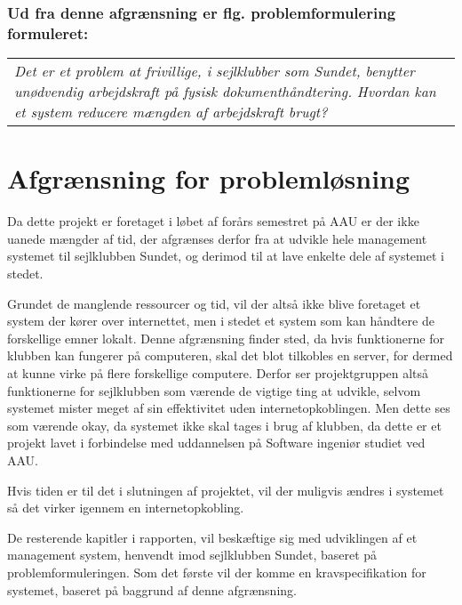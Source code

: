 \subsubsection*{Ud fra denne afgrænsning er flg. problemformulering formuleret:}
\begin{center}
\begin{tabular}{|p{14cm}|}
\textit{Det er et problem at frivillige, i sejlklubber som Sundet, benytter unødvendig arbejdskraft på fysisk dokumenthåndtering. Hvordan kan et system reducere mængden af arbejdskraft brugt? }
\end{tabular}
\end{center}


\section{Afgrænsning for problemløsning}

Da dette projekt er foretaget i løbet af forårs semestret på AAU er der ikke uanede mængder af tid, der afgrænses derfor fra at udvikle hele management systemet til sejlklubben Sundet, og derimod til at lave enkelte dele af systemet i stedet. 

Grundet de manglende ressourcer og tid, vil der altså ikke blive foretaget et system der kører over internettet, men i stedet et system som kan håndtere de forskellige emner lokalt. Denne afgrænsning finder sted, da hvis funktionerne for klubben kan fungerer på computeren, skal det blot tilkobles en server, for dermed at kunne virke på flere forskellige computere. Derfor ser projektgruppen altså funktionerne for sejlklubben som værende de vigtige ting at udvikle, selvom systemet mister meget af sin effektivitet uden internetopkoblingen. Men dette ses som værende okay, da systemet ikke skal tages i brug af klubben, da dette er et projekt lavet i forbindelse med uddannelsen på Software ingeniør studiet ved AAU.

Hvis tiden er til det i slutningen af projektet, vil der muligvis ændres i systemet så det virker igennem en internetopkobling.

De resterende kapitler i rapporten, vil beskæftige sig med udviklingen af et management system, henvendt imod sejlklubben Sundet, baseret på problemformuleringen. Som det første vil der komme en kravspecifikation for systemet, baseret på baggrund af denne afgrænsning.


